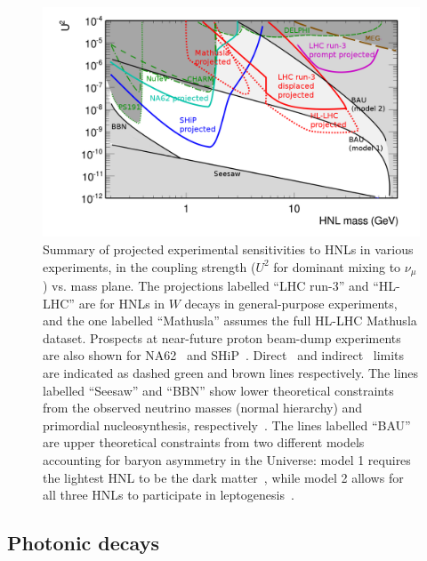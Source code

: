 \begin{figure}[t]
\centering
\includegraphics[width=0.99\linewidth]{figures/BigPicture.png}
\caption{Summary of projected experimental sensitivities to HNLs in various experiments, in the coupling strength ($U^2$ for dominant mixing to $\nu_\mu$) vs. mass plane. The projections labelled ``LHC run-3'' and ``HL-LHC'' are for HNLs in $W$ decays in general-purpose experiments, and the one labelled ``Mathusla'' assumes the full HL-LHC Mathusla dataset. Prospects at near-future proton beam-dump experiments are also shown for NA62~\cite{Lanfranchi2017} and SHiP~\cite{SHiP2015}. Direct~\cite{Bernardi1988,CHARM1986,NuTeV1999,Delphi1997,CMS2015b} and indirect~\cite{MEG2013,Antusch2015} limits are indicated as dashed green and brown lines respectively. The lines labelled ``Seesaw'' and ``BBN'' show lower theoretical constraints from the observed neutrino masses (normal hierarchy) and primordial nucleosynthesis, respectively~\cite{Canetti2013b}. The lines labelled ``BAU'' are upper theoretical constraints from two different models accounting for baryon asymmetry in the Universe: model 1 requires the lightest HNL to be the dark matter~\cite{Canetti2013b}, while model 2 allows for all three HNLs to participate in leptogenesis~\cite{Canetti2014}. }
\label{fig:HNLsensitivity}
\end{figure}

\subsection{Photonic decays}
\label{subsec:dphotons}

